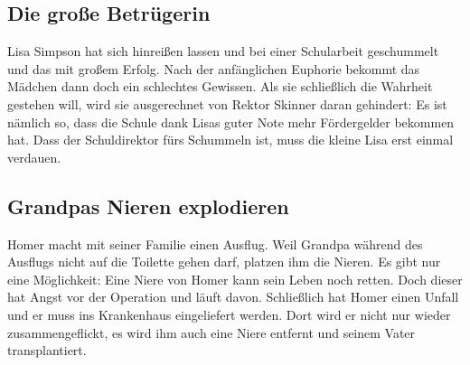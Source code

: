 	
\subsection{Die große Betrügerin}\label{AABF03}
Lisa Simpson hat sich hinreißen lassen und bei einer Schularbeit geschummelt und das mit großem Erfolg. Nach der anfänglichen Euphorie bekommt das Mädchen dann doch ein schlechtes Gewissen. Als sie schließlich die Wahrheit gestehen will, wird sie ausgerechnet von Rektor Skinner daran gehindert: Es ist nämlich so, dass die Schule dank Lisas guter Note mehr Fördergelder bekommen hat. Dass der Schuldirektor fürs Schummeln ist, muss die kleine Lisa erst einmal verdauen.


\subsection{Grandpas Nieren explodieren}\label{AABF04}
Homer macht mit seiner Familie einen Ausflug. Weil Grandpa während des Ausflugs nicht auf die Toilette gehen darf, platzen ihm die Nieren. Es gibt nur eine Möglichkeit: Eine Niere von Homer kann sein Leben noch retten. Doch dieser hat Angst vor der Operation und läuft davon. Schließlich hat Homer einen Unfall und er muss ins Krankenhaus eingeliefert werden. Dort wird er nicht nur wieder zusammengeflickt, es wird ihm auch eine Niere entfernt und seinem Vater transplantiert.

